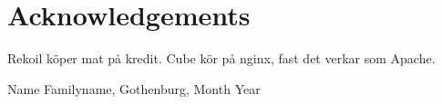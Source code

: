 \thispagestyle{plain}			%
\section*{Acknowledgements}
Rekoil köper mat på kredit. Cube kör på nginx, fast det verkar som Apache.

\vspace{1.5cm}
\hfill
Name Familyname, Gothenburg, Month Year

\newpage				%
\thispagestyle{empty}
\mbox{}
